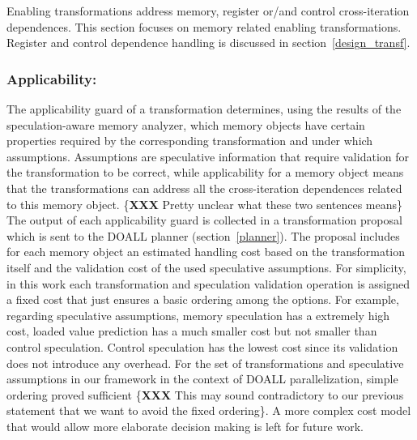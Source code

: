 Enabling transformations address memory, register or/and control
cross-iteration dependences.
%
This section focuses on memory related enabling transformations.
Register and control dependence handling is discussed in
section~\ref{design_transf}.


%
\subsubsection{Applicability:}

%
The applicability guard of a transformation determines, using the
results of the speculation-aware memory analyzer,  which memory
objects have certain properties required by the corresponding
transformation and under which assumptions.
%
Assumptions are speculative information that require validation for
the transformation to be correct, while applicability for a memory
object means that the transformations can address all the
cross-iteration dependences related to this memory object. \{\textbf{XXX}
Pretty unclear what these two sentences means\}
%
The output of each applicability guard is collected in a
transformation proposal which is sent to the DOALL
planner (section~\ref{planner}).
%
The proposal includes for each memory object an estimated handling
cost based on the transformation itself and the validation cost of the
used speculative assumptions.
%
%
For simplicity, in this work each transformation and speculation
validation operation is assigned a fixed
cost that just ensures a basic ordering among the options. For
example, regarding speculative assumptions, memory speculation has a
extremely high cost, loaded value prediction has a much smaller cost
but not smaller than control speculation. Control speculation has the
lowest cost since its validation does not introduce any overhead.
%
%
For the set of transformations and speculative assumptions in our
framework in the context of DOALL parallelization, simple ordering
proved sufficient \{\textbf{XXX} This may sound contradictory to our
previous statement that we want to avoid the fixed ordering\}.
%
A more complex cost model that would allow more elaborate decision
making is left for future work.

